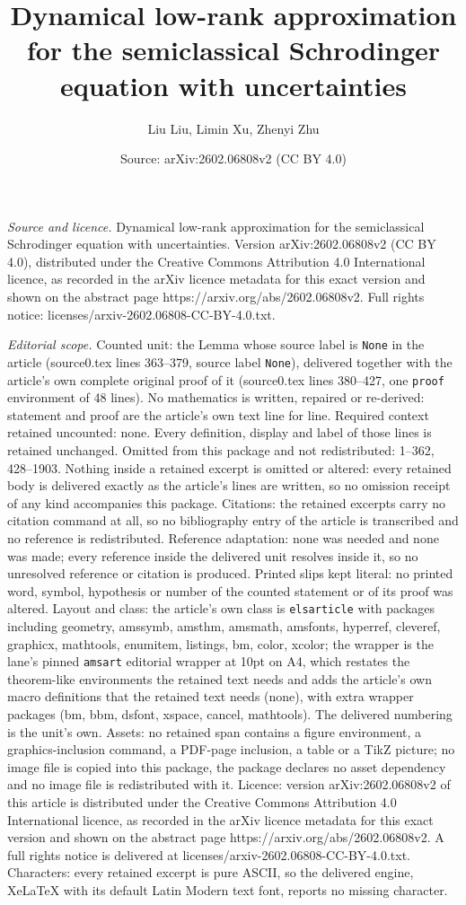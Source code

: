 \documentclass[10pt,a4paper]{amsart}
\title[Dynamical low-rank approximation for the semiclassical Schro]{Dynamical low-rank approximation for the semiclassical Schrodinger equation with uncertainties}
\author{Liu Liu, Limin Xu, Zhenyi Zhu}
\date{Source: arXiv:2602.06808v2 (CC BY 4.0)}
\begin{document}
\maketitle

\noindent\emph{Source and licence.} Dynamical low-rank approximation for the semiclassical Schrodinger equation with uncertainties. Version arXiv:2602.06808v2 (CC BY 4.0), distributed under the Creative Commons Attribution 4.0 International licence, as recorded in the arXiv licence metadata for this exact version and shown on the abstract page https://arxiv.org/abs/2602.06808v2. Full rights notice: licenses/arxiv-2602.06808-CC-BY-4.0.txt.\par\smallskip

\noindent\textit{Editorial scope.} Counted unit: the Lemma whose source label is \texttt{None} in the article (source0.tex lines 363--379, source label \texttt{None}), delivered together with the article's own complete original proof of it (source0.tex lines 380--427, one \texttt{proof} environment of 48 lines). No mathematics is written, repaired or re-derived: statement and proof are the article's own text line for line. Required context retained uncounted: none. Every definition, display and label of those lines is retained unchanged. Omitted from this package and not redistributed: 1--362, 428--1903. Nothing inside a retained excerpt is omitted or altered: every retained body is delivered exactly as the article's lines are written, so no omission receipt of any kind accompanies this package. Citations: the retained excerpts carry no citation command at all, so no bibliography entry of the article is transcribed and no reference is redistributed. Reference adaptation: none was needed and none was made; every reference inside the delivered unit resolves inside it, so no unresolved reference or citation is produced. Printed slips kept literal: no printed word, symbol, hypothesis or number of the counted statement or of its proof was altered. Layout and class: the article's own class is \texttt{elsarticle} with packages including geometry, amssymb, amsthm, amsmath, amsfonts, hyperref, cleveref, graphicx, mathtools, enumitem, listings, bm, color, xcolor; the wrapper is the lane's pinned \texttt{amsart} editorial wrapper at 10pt on A4, which restates the theorem-like environments the retained text needs and adds the article's own macro definitions that the retained text needs (none), with extra wrapper packages (bm, bbm, dsfont, xspace, cancel, mathtools). The delivered numbering is the unit's own. Assets: no retained span contains a figure environment, a graphics-inclusion command, a PDF-page inclusion, a table or a TikZ picture; no image file is copied into this package, the package declares no asset dependency and no image file is redistributed with it. Licence: version arXiv:2602.06808v2 of this article is distributed under the Creative Commons Attribution 4.0 International licence, as recorded in the arXiv licence metadata for this exact version and shown on the abstract page https://arxiv.org/abs/2602.06808v2. A full rights notice is delivered at licenses/arxiv-2602.06808-CC-BY-4.0.txt. Characters: every retained excerpt is pure ASCII, so the delivered engine, XeLaTeX with its default Latin Modern text font, reports no missing character.
\end{document}

